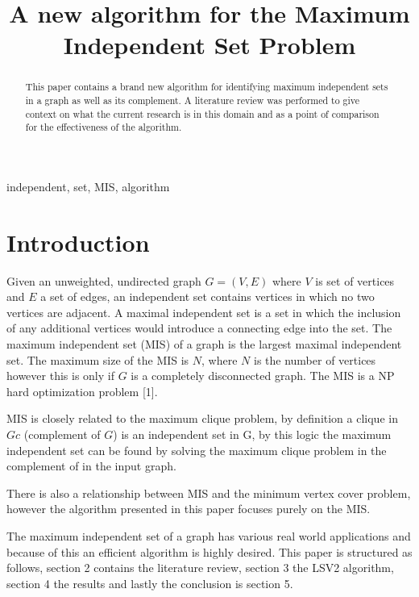 \documentclass[conference]{IEEEtran}
\begin{document}
\title{A new algorithm for the Maximum Independent Set Problem}

\author{
}

\maketitle

\begin{abstract}
This paper contains a brand new algorithm for identifying maximum independent sets in a graph as well as its complement.
A literature review was performed to give context on what the current research is in this domain and as a point of 
comparison for the effectiveness of the algorithm.
\end{abstract}

\begin{IEEEkeywords}
independent, set, MIS, algorithm
\end{IEEEkeywords}

\section{Introduction}
Given an unweighted, undirected graph $G = (V, E)$ where $V$ is set of vertices and $E$ a set of edges, an 
independent set contains vertices in which no two vertices are adjacent. A maximal independent set is a set in 
which the inclusion of any additional vertices would introduce a connecting edge into the set. The maximum independent 
set (MIS) of a graph is the largest maximal independent set. The maximum size of the MIS is $N$, where $N$ is the number
of vertices however this is only if $G$ is a completely disconnected graph. The MIS is a NP hard optimization problem [1].

MIS is closely related to the maximum clique problem, by definition a clique in $Gc$ (complement of $G$) is an 
independent set in G, by this logic the maximum independent set can be found by solving the maximum clique problem in 
the complement of in the input graph. 

There is also a relationship between MIS and the minimum vertex cover problem, however the algorithm presented in this
paper focuses purely on the MIS.

The maximum independent set of a graph has various real world applications and because of this an efficient algorithm is 
highly desired. This paper is structured as follows, section 2 contains the literature review, section 3 the LSV2 algorithm, section 4 
the results and lastly the conclusion is section 5.
\end{document}
